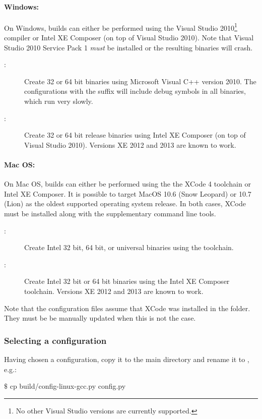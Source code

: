\paragraph{Windows:}
On Windows, builds can either be performed using the Visual Studio 2010\footnote{No other Visual Studio versions are currently supported.}
compiler or Intel XE Composer (on top of Visual Studio 2010).
Note that Visual Studio 2010 Service Pack 1 \emph{must} be installed or the resulting binaries will crash. 
\begin{description}
\item[:] Create 32 or 64 bit binaries using Microsoft Visual C++ version 2010.
The configurations with the suffix  will include debug symbols in all binaries, which run very slowly.
\item[:] Create 32 or 64 bit release binaries using Intel XE Composer (on top of Visual Studio 2010).
Versions XE 2012 and 2013 are known to work.
\end{description}
\paragraph{Mac OS:}
On Mac OS, builds can either be performed using the the XCode 4  toolchain or Intel XE Composer.
It is possible to target MacOS 10.6 (Snow Leopard) or 10.7 (Lion) as the oldest supported operating system release.
In both cases, XCode must be installed along with the supplementary command line tools.
\begin{description}
\item[:] Create Intel 32 bit, 64 bit, or universal binaries using the  toolchain.
\item[:] Create Intel 32 bit or 64 bit binaries using the Intel XE Composer toolchain.
Versions XE 2012 and 2013 are known to work.
\end{description}
Note that the configuration files assume that XCode was
installed in the  folder. They must be be manually updated
when this is not the case.
\subsubsection{Selecting a configuration}
Having chosen a configuration, copy it to the main directory and rename it to , e.g.:
\begin{shell}
$\texttt{\$}$ cp build/config-linux-gcc.py config.py
\end{shell}

